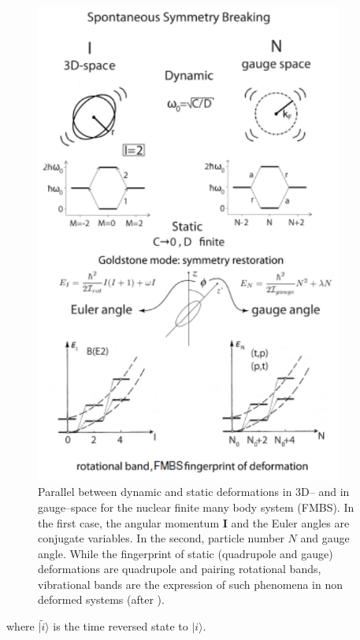 \begin{figure}
\centerline{\includegraphics*[width=0.9\textwidth,angle=0]{nutshell/figs/fig1D1.pdf}}
\caption{Parallel between dynamic and static deformations in 3D-- and in gauge--space for the nuclear finite many body system (FMBS). In the first case, the angular momentum $\mathbf{I}$ and the Euler angles are conjugate variables. In the second, particle number $N$ and gauge angle. While the fingerprint of static (quadrupole and gauge) deformations are quadrupole and pairing rotational bands, vibrational bands are the expression of such phenomena in non deformed systems (after \cite{Broglia:73}).}\label{fig1D1}
\end{figure}
where $|\tilde i\rangle$  is the time reversed state to  $| i\rangle$.


